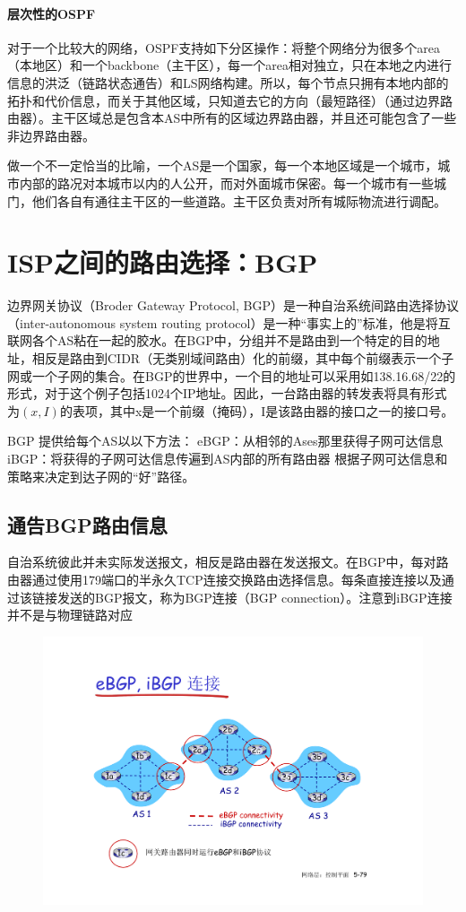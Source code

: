 \documentclass[]{report}
\newcommand{\quan}[1]{{\nmfont \symbol{#1}}}
\newcommand{\kk}[1]{\quan{\numexpr32+#1}}%
\begin{document}
			\paragraph{层次性的OSPF}
			对于一个比较大的网络，OSPF支持如下分区操作：将整个网络分为很多个area（本地区）和一个backbone（主干区），每一个area相对独立，只在本地之内进行信息的洪泛（链路状态通告）和LS网络构建。所以，每个节点只拥有本地内部的拓扑和代价信息，而关于其他区域，只知道去它的方向（最短路径）（通过边界路由器）。主干区域总是包含本AS中所有的区域边界路由器，并且还可能包含了一些非边界路由器。\par
			做一个不一定恰当的比喻，一个AS是一个国家，每一个本地区域是一个城市，城市内部的路况对本城市以内的人公开，而对外面城市保密。每一个城市有一些城门，他们各自有通往主干区的一些道路。主干区负责对所有城际物流进行调配。
	\section{ISP之间的路由选择：BGP}
	边界网关协议（Broder Gateway Protocol, BGP）是一种自治系统间路由选择协议（inter-autonomous system routing protocol）是一种“事实上的”标准，他是将互联网各个AS粘在一起的胶水。在BGP中，分组并不是路由到一个特定的目的地址，相反是路由到CIDR（无类别域间路由）化的前缀，其中每个前缀表示一个子网或一个子网的集合。在BGP的世界中，一个目的地址可以采用如138.16.68/22的形式，对于这个例子包括1024个IP地址。因此，一台路由器的转发表将具有形式为$(x,I)$的表项，其中x是一个前缀（掩码），I是该路由器的接口之一的接口号。\par
	BGP 提供给每个AS以以下方法： \kk{1} eBGP：从相邻的Ases那里获得子网可达信息 \kk{2} iBGP：将获得的子网可达信息传遍到AS内部的所有路由器 \kk{3} 根据子网可达信息和策略来决定到达子网的“好”路径。
		\subsection{通告BGP路由信息}
		自治系统彼此并未实际发送报文，相反是路由器在发送报文。在BGP中，每对路由器通过使用179端口的半永久TCP连接交换路由选择信息。每条直接连接以及通过该链接发送的BGP报文，称为BGP连接（BGP connection）。注意到iBGP连接并不是与物理链路对应
		\begin{figure}
			\centering
			\begin{minipage}{40em}
				\centering
				\includegraphics[scale = 0.4]{images/eBGP_and_iBGP.pdf}
			\end{minipage}
		\end{figure}
\end{document}
